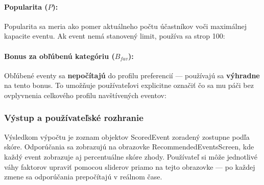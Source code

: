   \paragraph{Popularita ($P$):}
  Popularita sa meria ako pomer aktuálneho počtu účastníkov voči
  maximálnej kapacite eventu. Ak event nemá stanovený limit, používa
  sa strop 100:


  \paragraph{Bonus za obľúbenú kategóriu ($B_{fav}$):}
  Obľúbené eventy sa \textbf{nepočítajú} do profilu preferencií —
  používajú sa \textbf{výhradne} na tento bonus. To umožňuje
  používateľovi explicitne označiť čo sa mu páči bez ovplyvnenia
  celkového profilu navštívených eventov:

  \subsubsection{Výstup a používateľské rozhranie}

  Výsledkom výpočtu je zoznam objektov ScoredEvent zoradený
  zostupne podľa skóre. Odporúčania sa zobrazujú na obrazovke
  RecommendedEventsScreen, kde každý event zobrazuje aj
  percentuálne skóre zhody. Používateľ si môže jednotlivé váhy faktorov
  upraviť pomocou sliderov priamo na tejto obrazovke — po každej zmene
  sa odporúčania prepočítajú v reálnom čase.